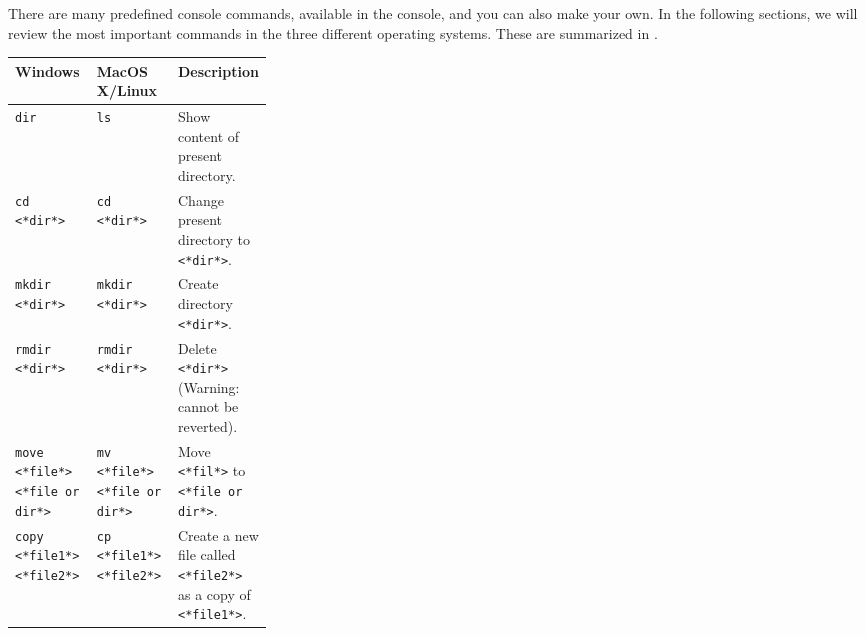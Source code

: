 There are many predefined console commands, available in the console, and you can also make your own. In the following sections, we will review the most important commands in the three different operating systems. These are summarized in .
\begin{table}
  \centering
  \begin{tabular}{|l|l||p{0.3\linewidth}|}
    \hline
    Windows & MacOS X/Linux & Description 
    \\ \hline\hline
    {\lstinline[language=syntax]|dir|}
            & {\lstinline[language=syntax]|ls|}
                            & Show content of present directory.
    \\ \hline
    {\lstinline[language=syntax]|cd <*dir*>|} 
            &{\lstinline[language=syntax]|cd <*dir*>|} 
                          & Change present directory to {\lstinline[language=syntax]|<*dir*>|}. 
    \\ \hline
    {\lstinline[language=syntax]|mkdir <*dir*>|}
            & {\lstinline[language=syntax]|mkdir <*dir*>|}
                          & Create directory {\lstinline[language=syntax]|<*dir*>|}. \\ \hline
    {\lstinline[language=syntax]|rmdir <*dir*>|}
            & {\lstinline[language=syntax]|rmdir <*dir*>|}
                          & Delete {\lstinline[language=syntax]|<*dir*>|} (Warning: cannot be reverted). \\ \hline
    {\lstinline[language=syntax, keywords={}]|move <*file*> <*file or dir*>|\hspace*{5mm}}%
            &{\lstinline[language=syntax, keywords={}]|mv <*file*> <*file or dir*>|}
                          & Move {\lstinline[language=syntax]|<*fil*>|} to {\lstinline[language=syntax, keywords={}]|<*file or dir*>|}. \\ \hline
    {\lstinline[language=syntax]|copy <*file1*> <*file2*>|}
            &{\lstinline[language=syntax]|cp <*file1*> <*file2*>|}
             & Create a new file called {\lstinline[language=syntax]|<*file2*>|} as a copy of {\lstinline[language=syntax]|<*file1*>|}. \\ \hline

\end{tabular}
\end{table}
